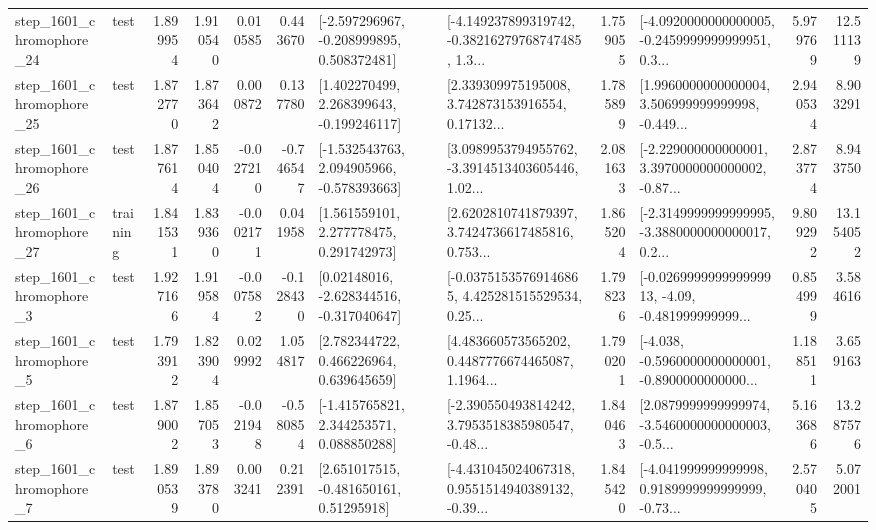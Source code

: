 \begin{tabular}{llrrrrllrlrr}
 step\_1601\_chromophore\_24 &      test &      1.899954 &    1.910540 &      0.010585 &  0.443670 &   [-2.597296967, -0.208999895, 0.508372481] &  [-4.149237899319742, -0.38216279768747485, 1.3... &       1.759055 &  [-4.0920000000000005, -0.2459999999999951, 0.3... &            5.979769 &         12.511139 \\
 step\_1601\_chromophore\_25 &      test &      1.872770 &    1.873642 &      0.000872 &  0.137780 &    [1.402270499, 2.268399643, -0.199246117] &  [2.339309975195008, 3.742873153916554, 0.17132... &       1.785899 &  [1.9960000000000004, 3.506999999999998, -0.449... &            2.940534 &          8.903291 \\
 step\_1601\_chromophore\_26 &      test &      1.877614 &    1.850404 &     -0.027210 & -0.746547 &   [-1.532543763, 2.094905966, -0.578393663] &  [3.0989953794955762, -3.3914513403605446, 1.02... &       2.081633 &  [-2.229000000000001, 3.3970000000000002, -0.87... &            2.873774 &          8.943750 \\
 step\_1601\_chromophore\_27 &  training &      1.841531 &    1.839360 &     -0.002171 &  0.041958 &     [1.561559101, 2.277778475, 0.291742973] &  [2.6202810741879397, 3.7424736617485816, 0.753... &       1.865204 &  [-2.3149999999999995, -3.3880000000000017, 0.2... &            9.809292 &         13.154052 \\
  step\_1601\_chromophore\_3 &      test &      1.927166 &    1.919584 &     -0.007582 & -0.128430 &    [0.02148016, -2.628344516, -0.317040647] &  [-0.03751535769146865, 4.425281515529534, 0.25... &       1.798236 &  [-0.026999999999999913, -4.09, -0.481999999999... &            0.854999 &          3.584616 \\
  step\_1601\_chromophore\_5 &      test &      1.793912 &    1.823904 &      0.029992 &  1.054817 &     [2.782344722, 0.466226964, 0.639645659] &  [4.483660573565202, 0.4487776674465087, 1.1964... &       1.790201 &  [-4.038, -0.5960000000000001, -0.8900000000000... &            1.188511 &          3.659163 \\
  step\_1601\_chromophore\_6 &      test &      1.879002 &    1.857053 &     -0.021948 & -0.580854 &    [-1.415765821, 2.344253571, 0.088850288] &  [-2.390550493814242, 3.7953518385980547, -0.48... &       1.840463 &  [2.0879999999999974, -3.5460000000000003, -0.5... &            5.163686 &         13.287576 \\
  step\_1601\_chromophore\_7 &      test &      1.890539 &    1.893780 &      0.003241 &  0.212391 &     [2.651017515, -0.481650161, 0.51295918] &  [-4.431045024067318, 0.9551514940389132, -0.39... &       1.845420 &  [-4.041999999999998, 0.9189999999999999, -0.73... &            2.570405 &          5.072001 \\

\end{tabular}
